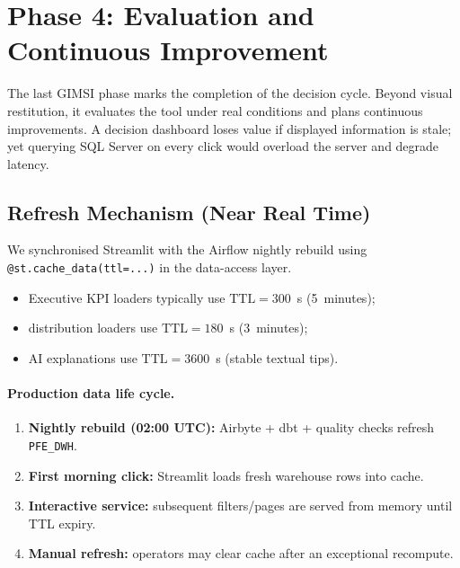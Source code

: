 \section{Phase 4: Evaluation and Continuous Improvement}
\label{sec:gimsi_phase4}
The last GIMSI phase marks the completion of the decision cycle. Beyond visual
restitution, it evaluates the tool under real conditions and plans continuous
improvements. A decision dashboard loses value if displayed information is stale;
yet querying SQL Server on every click would overload the server and degrade
latency.

\subsection{Refresh Mechanism (Near Real Time)}
We synchronised Streamlit with the Airflow nightly rebuild using
\texttt{@st.cache\_data(ttl=...)} in the data-access layer.

\begin{itemize}
    \item Executive KPI loaders typically use $\mathrm{TTL}=300$~s (5~minutes);
    \item distribution loaders use $\mathrm{TTL}=180$~s (3~minutes);
    \item AI explanations use $\mathrm{TTL}=3600$~s (stable textual tips).
\end{itemize}

\paragraph{Production data life cycle.}
\begin{enumerate}
    \item \textbf{Nightly rebuild (02:00 UTC):} Airbyte + dbt + quality checks
          refresh \texttt{PFE\_DWH}.
    \item \textbf{First morning click:} Streamlit loads fresh warehouse rows into
          cache.
    \item \textbf{Interactive service:} subsequent filters/pages are served from
          memory until TTL expiry.
    \item \textbf{Manual refresh:} operators may clear cache after an exceptional
          recompute.
\end{enumerate}

